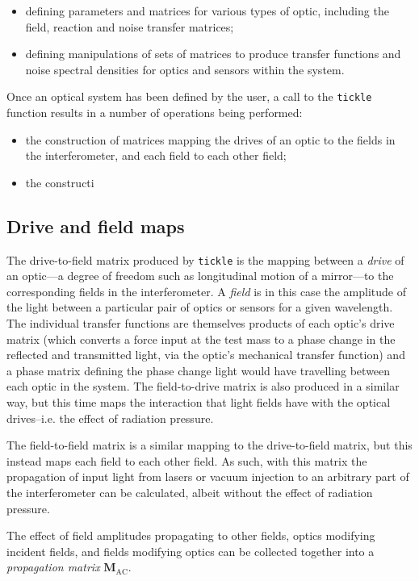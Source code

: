 \begin{itemize}
  \item defining parameters and matrices for various types of optic, including the field, reaction and noise transfer matrices;
  \item defining manipulations of sets of matrices to produce transfer functions and noise spectral densities for optics and sensors within the system.
\end{itemize}

Once an optical system has been defined by the user, a call to the \lstinline!tickle! function results in a number of operations being performed:
\begin{itemize}
  \item the construction of matrices mapping the drives of an optic to the fields in the interferometer, and each field to each other field;
  \item the constructi
\end{itemize}

\subsection{Drive and field maps}
The drive-to-field matrix produced by \lstinline!tickle! is the mapping between a \emph{drive} of an optic---a degree of freedom such as longitudinal motion of a mirror---to the corresponding fields in the interferometer. A \emph{field} is in this case the amplitude of the light between a particular pair of optics or sensors for a given wavelength. The individual transfer functions are themselves products of each optic's drive matrix (which converts a force input at the test mass to a phase change in the reflected and transmitted light, via the optic's mechanical transfer function) and a phase matrix defining the phase change light would have travelling between each optic in the system. The field-to-drive matrix is also produced in a similar way, but this time maps the interaction that light fields have with the optical drives--i.e. the effect of radiation pressure.

The field-to-field matrix is a similar mapping to the drive-to-field matrix, but this instead maps each field to each other field. As such, with this matrix the propagation of input light from lasers or vacuum injection to an arbitrary part of the interferometer can be calculated, albeit without the effect of radiation pressure.

The effect of field amplitudes propagating to other fields, optics modifying incident fields, and fields modifying optics can be collected together into a \emph{propagation matrix} $\mathbf{M}_{\text{AC}}$.

